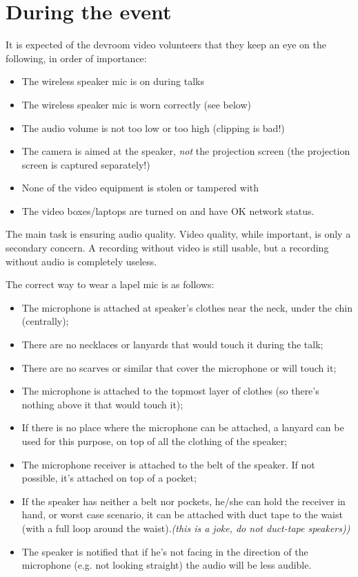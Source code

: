 \documentclass{article}
\begin{document}
\section{During the event}
It is expected of the devroom video volunteers that they keep an eye on the following, in order of importance:
\begin{itemize}
  \item The wireless speaker mic is on during talks
  \item The wireless speaker mic is worn correctly (see below)
  \item The audio volume is not too low or too high (clipping is bad!)
  \item The camera is aimed at the speaker, \emph{not} the projection screen (the projection screen is captured separately!)
  \item None of the video equipment is stolen or tampered with
  \item The video boxes/laptops are turned on and have OK network status.
\end{itemize}
The main task is ensuring audio quality. Video quality, while important, is only a secondary concern. A recording without video is still usable, but a recording without audio is completely useless.

The correct way to wear a lapel mic is as follows:
\begin{itemize}
  \item The microphone is attached at speaker's clothes near the neck, under the chin (centrally);
  \item There are no necklaces or lanyards that would touch it during the talk;
  \item There are no scarves or similar that cover the microphone or will touch it;
  \item The microphone is attached to the topmost layer of clothes (so there's nothing above it that would touch it);
  \item If there is no place where the microphone can be attached, a lanyard can be used for this purpose, on top of all the clothing of the speaker;
  \item The microphone receiver is attached to the belt of the speaker. If not possible, it's attached on top of a pocket;
  \item If the speaker has neither a belt nor pockets, he/she can hold the receiver in hand, or worst case scenario, it can be attached with duct tape to the waist (with a full loop around the waist).\emph{(this is a joke, do not duct-tape speakers))}
  \item The speaker is notified that if he's not facing in the direction of the microphone (e.g. not looking straight) the audio will be less audible.
\end{itemize}
\end{document}
